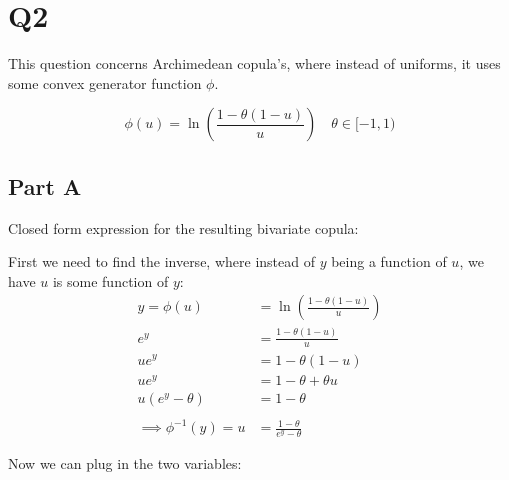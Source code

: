 \documentclass[
  oneside]{book}
\begin{document}
\hypertarget{q2-2}{%
\section{Q2}\label{q2-2}}

This question concerns Archimedean copula's, where instead of uniforms, it uses some convex generator function \(\phi\).

\[
\phi(u) = \ln \left( \frac{1-\theta(1-u)}{u} \right) \quad \theta \in [-1,1)
\]

\hypertarget{part-a-4}{%
\subsection{Part A}\label{part-a-4}}

Closed form expression for the resulting bivariate copula:

First we need to find the inverse, where instead of \(y\) being a function of \(u\), we have \(u\) is some function of \(y\):
\[
\begin{aligned}
y = \phi(u) &= \ln \left( \frac{1-\theta(1-u)}{u} \right)\\
e^{y}&= \frac{1-\theta(1-u)}{u}\\
ue^{y} &= 1-\theta(1-u)\\
ue^{y} &= 1-\theta +\theta u\\
u(e^{y}-\theta) &= 1-\theta\\
\\
\implies \phi ^{-1}(y) = u &= \frac{1-\theta}{e^{y}-\theta}
\end{aligned}
\]

Now we can plug in the two variables:
\end{document}
